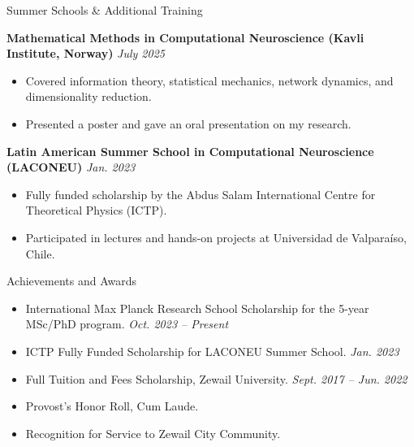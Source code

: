 \documentclass{resume} %
\begin{document}
\begin{rSection}{Summer Schools \& Additional Training}

\textbf{Mathematical Methods in Computational Neuroscience (Kavli Institute, Norway)} \hfill \textit{July 2025}
\begin{itemize}
    \item Covered information theory, statistical mechanics, network dynamics, and dimensionality reduction.
    \item Presented a poster and gave an oral presentation on my research.
\end{itemize}

\textbf{Latin American Summer School in Computational Neuroscience (LACONEU)} \hfill \textit{Jan. 2023}
\begin{itemize}
    \item Fully funded scholarship by the Abdus Salam International Centre for Theoretical Physics (ICTP).
    \item Participated in lectures and hands-on projects at Universidad de Valparaíso, Chile.
\end{itemize}

\end{rSection}


\begin{rSection}{Achievements and Awards}
\begin{itemize}
    \item International Max Planck Research School Scholarship for the 5-year MSc/PhD program. \hfill {\em Oct. 2023 -- Present}
    \item ICTP Fully Funded Scholarship for LACONEU Summer School. \hfill {\em Jan. 2023}
    \item Full Tuition and Fees Scholarship, Zewail University. \hfill {\em Sept. 2017 -- Jun. 2022}
    \item Provost's Honor Roll, Cum Laude.
    \item Recognition for Service to Zewail City Community.
\end{itemize}
\end{rSection}

\end{document}
